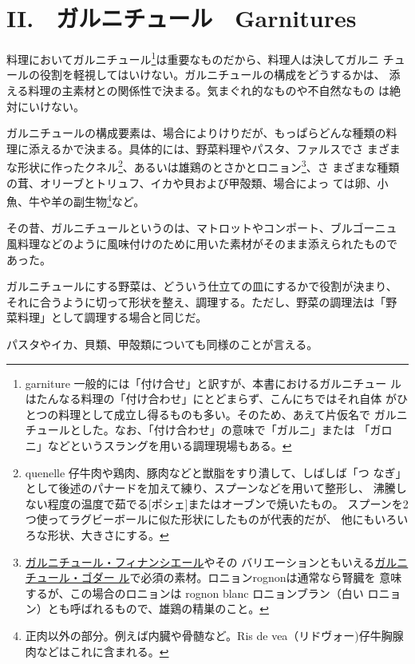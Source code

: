 \hypertarget{garnitures}{%
\chapter{II.　ガルニチュール　Garnitures}\label{garnitures}}

 

料理においてガルニチュール\footnote{garniture
  一般的には「付け合せ」と訳すが、本書におけるガルニチュー
  ルはたんなる料理の「付け合わせ」にとどまらず、こんにちではそれ自体
  がひとつの料理として成立し得るものも多い。そのため、あえて片仮名で
  ガルニチュールとした。なお、「付け合わせ」の意味で「ガルニ」または
  「ガロニ」などというスラングを用いる調理現場もある。}は重要なものだから、料理人は決してガルニ
チュールの役割を軽視してはいけない。ガルニチュールの構成をどうするかは、
添える料理の主素材との関係性で決まる。気まぐれ的なものや不自然なもの
は絶対にいけない。

ガルニチュールの構成要素は、場合によりけりだが、もっぱらどんな種類の料
理に添えるかで決まる。具体的には、野菜料理やパスタ、ファルスでさ
まざまな形状に作ったクネル\footnote{quenelle
  仔牛肉や鶏肉、豚肉などと獣脂をすり潰して、しばしば「つ
  なぎ」として後述のパナードを加えて練り、スプーンなどを用いて整形し、
  沸騰しない程度の温度で茹でる{[}ポシェ{]}またはオーブンで焼いたもの。
  スプーンを2つ使ってラグビーボールに似た形状にしたものが代表的だが、
  他にもいろいろな形状、大きさにする。}、あるいは雄鶏のとさかとロニョン\footnote{\protect\hyperlink{garniture-financiere}{ガルニチュール・フィナンシエール}やその
  バリエーションともいえる\protect\hyperlink{garniture-godard}{ガルニチュール・ゴダー
  ル}で必須の素材。ロニョンrognonは通常なら腎臓を
  意味するが、この場合のロニョンは rognon blanc ロニョンブラン（白い
  ロニョン）とも呼ばれるもので、雄鶏の精巣のこと。}、さ
まざまな種類の茸、オリーブとトリュフ、イカや貝および甲殻類、場合によっ
ては卵、小魚、牛や羊の副生物\footnote{正肉以外の部分。例えば内臓や骨髄など。Ris
  de vea（リドヴォー)仔牛胸腺肉などはこれに含まれる。}など。

その昔、ガルニチュールというのは、マトロットやコンポート、ブルゴーニュ
風料理などのように風味付けのために用いた素材がそのまま添えられたもので
あった。

ガルニチュールにする野菜は、どういう仕立ての皿にするかで役割が決まり、
それに合うように切って形状を整え、調理する。ただし、野菜の調理法は「野
菜料理」として調理する場合と同じだ。

パスタやイカ、貝類、甲殻類についても同様のことが言える。


